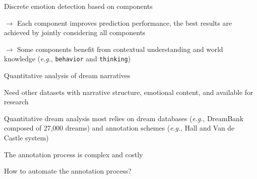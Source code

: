\documentclass[10pt]{beamer}
\begin{document}
\begin{frame}{Discrete emotion detection based on components}
\vspace{0.25cm}
\pause

$\rightarrow$ Each component improves prediction performance, the best results are achieved by jointly considering all components

\vspace{0.25cm}
\pause

$\rightarrow$ Some components benefit from contextual understanding and world knowledge (\textit{e.g.}, \texttt{behavior} and \texttt{thinking})

\end{frame}

\begin{frame}{Quantitative analysis of dream narratives}


Need other datasets with narrative structure, emotional content, and available for research

\vspace{0.5cm}
\pause

Quantitative dream analysis most relies on dream databases (\textit{e.g.}, DreamBank composed of 27,000 dreams) and annotation schemes (\textit{e.g.}, Hall and Van de Castle system) %

\vspace{0.5cm}
\pause

The annotation process is complex and costly

\vspace{0.5cm}
\pause

How to automate the annotation process?

    
\end{frame}
\end{document}

